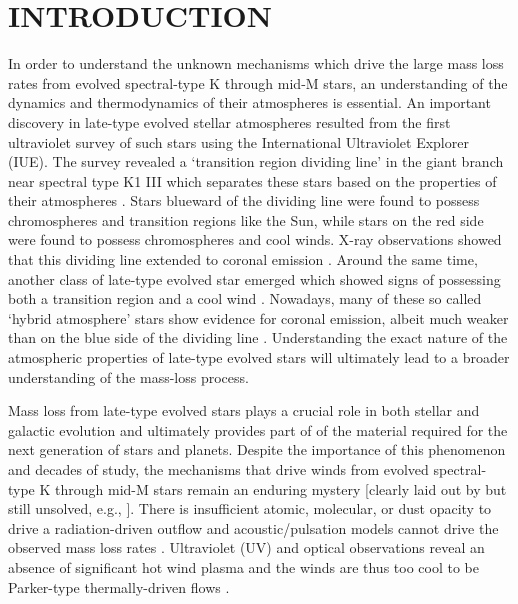 \documentclass[iop]{emulateapj}
\begin{document}

\section{INTRODUCTION}

In order to understand the unknown mechanisms which drive the large mass loss rates from evolved spectral-type K through mid-M stars, an understanding of the dynamics and thermodynamics of their atmospheres is essential. An important discovery in late-type evolved stellar atmospheres resulted from the first ultraviolet survey of such stars using the International Ultraviolet Explorer (IUE). The survey revealed a `transition region dividing line' in the giant branch near spectral type K1 III which separates these stars based on the properties of their atmospheres \citep{1979ApJ...229L..27L}. Stars blueward of the dividing line were found to possess chromospheres and transition regions like the Sun, while stars on the red side were found to possess chromospheres and cool winds. X-ray observations showed that this dividing line extended to coronal emission \citep{1981ApJ...250..293A}. Around the same time, another class of late-type evolved star emerged which showed signs of possessing both a transition region and a cool wind \citep[e.g.,][]{1982A&A...107..292R}. Nowadays, many of these so called `hybrid atmosphere' stars show evidence for coronal emission, albeit much weaker than on the blue side of the dividing line \citep{1997ApJ...491..876A,2005ApJ...622..629D}. Understanding the exact nature of the atmospheric properties of late-type evolved stars will ultimately lead to a broader understanding of the mass-loss process.

Mass loss from late-type evolved stars plays a crucial role in both stellar and galactic evolution and ultimately provides part of of the material required for the next generation of stars and planets. Despite the importance of this phenomenon and decades of study, the mechanisms that drive winds from evolved spectral-type K through mid-M stars remain an enduring mystery [clearly laid out by \cite{1985ASSL..117..229H} but still unsolved, e.g., \cite{2009AIPC.1094..267C}]. There is insufficient atomic, molecular, or dust opacity to drive a radiation-driven outflow and acoustic/pulsation models cannot drive the observed mass loss rates \citep{1995ApJ...442L..61S}. Ultraviolet (UV) and optical observations reveal an absence of significant hot wind plasma and the winds are thus too cool to be Parker-type thermally-driven flows \cite[e.g.,][]{1979ApJ...229L..27L,1981ApJ...250..293A}. 
\end{document}
